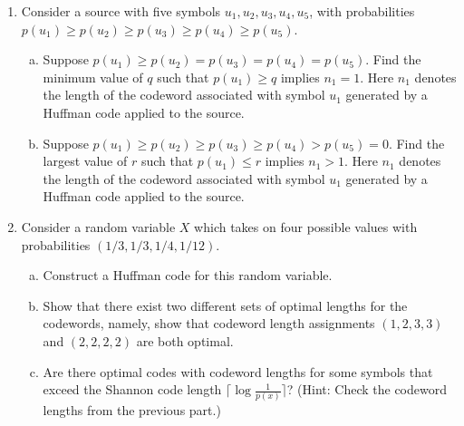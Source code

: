 \documentclass[12pt]{article}
\begin{document}
\begin{enumerate}
\begin{enumerate}[1)]
%
%
%


\item Consider a source with five symbols $u_1, u_2, u_3, u_4, u_5$, with probabilities $p(u_1) \geq p(u_2) \geq p(u_3) \geq p(u_4) \geq p(u_5)$.

\begin{enumerate}[(a)]
\item Suppose $p(u_1) \geq p(u_2) = p(u_3) = p(u_4) = p(u_5)$. Find the minimum value of $q$ such that $p(u_1) \geq q$ implies $n_1 = 1$. Here $n_1$ denotes the length of the codeword associated with symbol $u_1$ generated by a Huffman code applied to the source.

\item Suppose $p(u_1) \geq p(u_2) \geq p(u_3) \geq p(u_4) > p(u_5) = 0$. Find the largest value of $r$ such that $p(u_1) \leq r$ implies $n_1 > 1$. Here $n_1$ denotes the length of the codeword associated with symbol $u_1$ generated by a Huffman code applied to the source.

\end{enumerate}

\item Consider a random variable $X$ which takes on four possible values with probabilities $(1/3, 1/3, 1/4, 1/12)$.
\begin{enumerate}[(a)]
\item Construct a Huffman code for this random variable.
\item Show that there exist two different sets of optimal lengths for the codewords, namely, show that codeword length assignments $(1, 2, 3, 3)$ and $(2, 2, 2, 2)$ are both optimal.
\item Are there optimal codes with codeword lengths for some symbols that exceed the Shannon code length $\lceil \log \frac{1}{p(x)} \rceil$? (Hint: Check the codeword lengths from the previous part.)
\end{enumerate}




\end{enumerate}
\end{enumerate}
\end{document}
